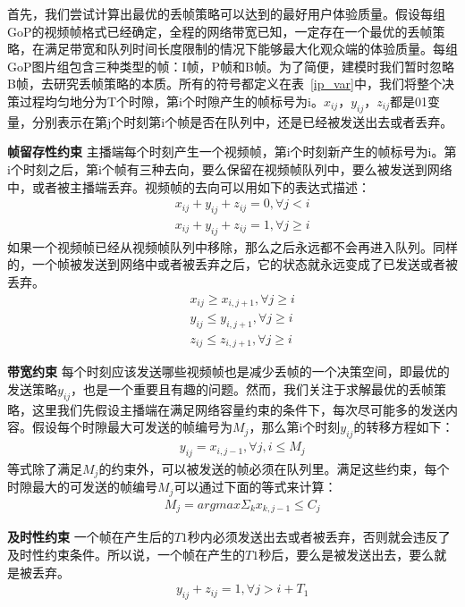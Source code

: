 首先，我们尝试计算出最优的丢帧策略可以达到的最好用户体验质量。假设每组GoP的视频帧格式已经确定，全程的网络带宽已知，一定存在一个最优的丢帧策略，在满足带宽和队列时间长度限制的情况下能够最大化观众端的体验质量。每组GoP图片组包含三种类型的帧：I帧，P帧和B帧。为了简便，建模时我们暂时忽略B帧，去研究丢帧策略的本质。所有的符号都定义在表~\ref{ip_var}中，我们将整个决策过程均匀地分为T个时隙，第i个时隙产生的帧标号为i。$x_{ij}$，$y_{ij}$，$z_{ij}$都是01变量，分别表示在第j个时刻第i个帧是否在队列中，还是已经被发送出去或者丢弃。

\textbf{帧留存性约束} 主播端每个时刻产生一个视频帧，第i个时刻新产生的帧标号为i。第i个时刻之后，第i个帧有三种去向，要么保留在视频帧队列中，要么被发送到网络中，或者被主播端丢弃。视频帧的去向可以用如下的表达式描述：
\begin{eqnarray}
  && x_{ij}+y_{ij}+z_{ij} = 0, \forall j<i \\
  && x_{ij}+y_{ij}+z_{ij} = 1, \forall j\geq i
\end{eqnarray}
如果一个视频帧已经从视频帧队列中移除，那么之后永远都不会再进入队列。同样的，一个帧被发送到网络中或者被丢弃之后，它的状态就永远变成了已发送或者被丢弃。
\begin{eqnarray}
  && x_{ij} \geq x_{i,j+1}, \forall j\geq i \\
  && y_{ij} \leq y_{i,j+1}, \forall j\geq i \\
  && z_{ij} \leq z_{i,j+1}, \forall j\geq i
\end{eqnarray}

\textbf{带宽约束} 每个时刻应该发送哪些视频帧也是减少丢帧的一个决策空间，即最优的发送策略$y_{ij}$，也是一个重要且有趣的问题。然而，我们关注于求解最优的丢帧策略，这里我们先假设主播端在满足网络容量约束的条件下，每次尽可能多的发送内容。假设每个时隙最大可发送的帧编号为$M_j$，那么第i个时刻$y_{ij}$的转移方程如下：
\begin{eqnarray}
  &&   y_{ij} = x_{i,j-1}, \forall j, i \leq M_{j}
\end{eqnarray}
等式除了满足$M_j$的约束外，可以被发送的帧必须在队列里。满足这些约束，每个时隙最大的可发送的帧编号$M_j$可以通过下面的等式来计算：
\begin{eqnarray}
 && M_j = argmax \Sigma_k x_{k,j-1} \leq C_{j}
\end{eqnarray}

\textbf{及时性约束} 一个帧在产生后的$T1$秒内必须发送出去或者被丢弃，否则就会违反了及时性约束条件。所以说，一个帧在产生的$T1$秒后，要么是被发送出去，要么就是被丢弃。
\begin{eqnarray}
  && y_{ij}+z_{ij} = 1 ,\forall j>i+T_1
\end{eqnarray}

